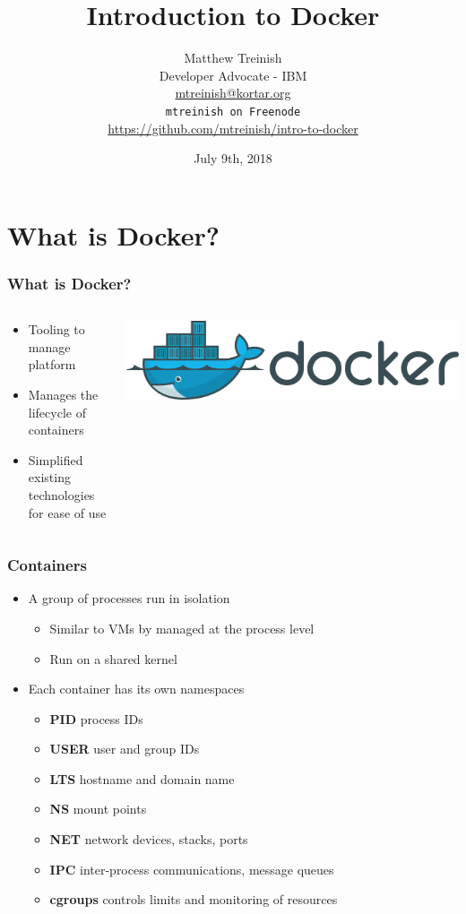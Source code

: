 \documentclass[aspectratio=169,11pt,hyperref={colorlinks=true}]{beamer}
\author[Matthew Treinish]{%
    \texorpdfstring{%
        \centering
        Matthew Treinish\\
        Developer Advocate - IBM \\
        \href{mailto:mtreinish@kortar.org}{mtreinish@kortar.org}\\
        \texttt{mtreinish on Freenode}\\
        \href{https://github.com/mtreinish/intro-to-docker}{https://github.com/mtreinish/intro-to-docker}
   }
   {Matthew Treinish}
}
\date{July 9th, 2018}
\title{Introduction to Docker}
\begin{document}
\titlepage

\section{What is Docker?}
\begin{frame}
    \frametitle{What is Docker?}
    \begin{columns}[T]
        \begin{column}{.48\textwidth}
            \begin{itemize}
                \item Tooling to manage platform
                \item Manages the lifecycle of containers
                \item Simplified existing technologies for ease of use
            \end{itemize}
        \end{column}
        \begin{column}{.48\textwidth}
            \includegraphics[width=.9\textwidth]{Docker_logo.png}
        \end{column} 
    \end{columns}
\end{frame}

\begin{frame}
    \frametitle{Containers}
    \begin{itemize}
    \item A group of processes run in isolation
        \begin{itemize}
            \item Similar to VMs by managed at the process level
            \item Run on a shared kernel
        \end{itemize}
    \item Each container has its own namespaces
        \begin{itemize}
            \item \textbf{PID} process IDs
            \item \textbf{USER} user and group IDs
            \item \textbf{LTS} hostname and domain name
            \item \textbf{NS} mount points
            \item \textbf{NET} network devices, stacks, ports
            \item \textbf{IPC} inter-process communications, message queues
            \item \textbf{cgroups} controls limits and monitoring of resources
        \end{itemize}
    \end{itemize}
\end{frame}
\end{document}

